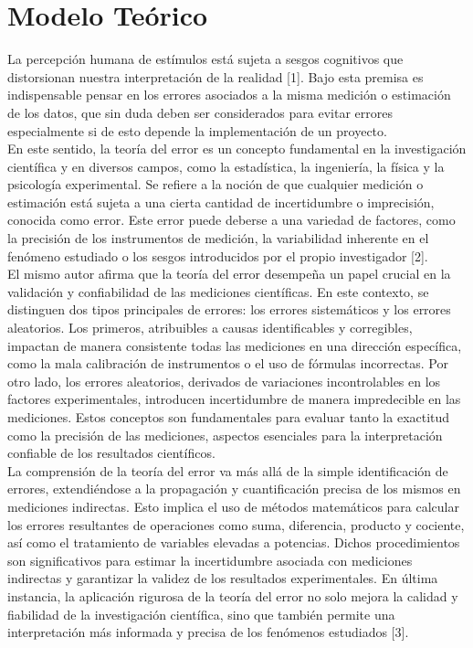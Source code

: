 \documentclass[runningheads]{llncs}
\begin{document}
    \section*{\centering Modelo Teórico}
    La percepción humana de estímulos está sujeta a sesgos cognitivos que distorsionan nuestra interpretación de la realidad [1]. Bajo esta premisa es indispensable pensar en los errores asociados a la misma medición o estimación de los datos, que sin duda deben ser considerados para evitar errores especialmente si de esto depende la implementación de un proyecto. \\
    En este sentido, la teoría del error es un concepto fundamental en la investigación científica y en diversos campos, como la estadística, la ingeniería, la física y la psicología experimental. Se refiere a la noción de que cualquier medición o estimación está sujeta a una cierta cantidad de incertidumbre o imprecisión, conocida como error. 
    Este error puede deberse a una variedad de factores, como la precisión de los instrumentos de medición, la variabilidad inherente en el fenómeno estudiado o los sesgos introducidos por el propio investigador [2].\\
    El mismo autor afirma que la teoría del error desempeña un papel crucial en la validación y confiabilidad de las mediciones científicas. En este contexto, se distinguen dos tipos principales de errores: los errores sistemáticos y los errores aleatorios. Los primeros, atribuibles a causas identificables y corregibles, impactan de manera consistente todas las mediciones en una dirección específica, como la mala calibración de instrumentos o el uso de fórmulas incorrectas. Por otro lado, los errores aleatorios, derivados de variaciones incontrolables en los factores experimentales, introducen incertidumbre de manera impredecible en las mediciones. Estos conceptos son fundamentales para evaluar tanto la exactitud como la precisión de las mediciones, aspectos esenciales para la interpretación confiable de los resultados científicos.\\
    La comprensión de la teoría del error va más allá de la simple identificación de errores, extendiéndose a la propagación y cuantificación precisa de los mismos en mediciones indirectas. Esto implica el uso de métodos matemáticos para calcular los errores resultantes de operaciones como suma, diferencia, producto y cociente, así como el tratamiento de variables elevadas a potencias. Dichos procedimientos son significativos para estimar la incertidumbre asociada con mediciones indirectas y garantizar la validez de los resultados experimentales. En última instancia, la aplicación rigurosa de la teoría del error no solo mejora la calidad y fiabilidad de la investigación científica, sino que también permite una interpretación más informada y precisa de los fenómenos estudiados [3].\\
    
\end{document}
